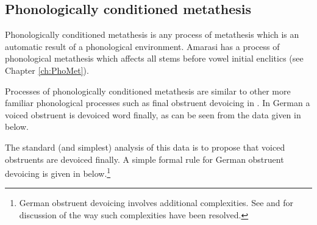 \subsection{Phonologically conditioned metathesis}\label{sec:PhoMet}
Phonologically conditioned metathesis is any process of metathesis
which is an automatic result of a phonological environment.
Amarasi has a process of phonological metathesis which affects all stems
before vowel initial enclitics (see Chapter \ref{ch:PhoMet}).

Processes of phonologically conditioned metathesis
are similar to other more familiar phonological processes
such as final obstruent devoicing in .
In German a voiced obstruent is devoiced word finally,
as can be seen from the data given in  below.

\begin{exe}
	\label{ex:GerFinObsDev}
\end{exe}

The standard (and simplest) analysis of this data is to propose
that voiced obstruents are devoiced finally.
A simple formal rule for German obstruent devoicing is given in  below.\footnote{
		German obstruent devoicing involves additional complexities.
		See \citep[200ff]{wi96} and \cite{br95} for discussion
		of the way such complexities have been resolved.}

